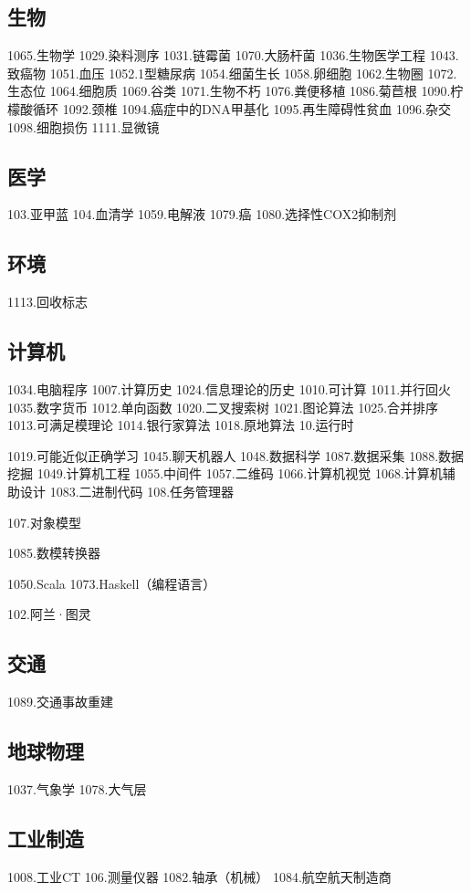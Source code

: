\subsection{生物}
1065.生物学
1029.染料测序
1031.链霉菌
1070.大肠杆菌
1036.生物医学工程
1043.致癌物
1051.血压
1052.1型糖尿病
1054.细菌生长
1058.卵细胞
1062.生物圈
1072.生态位
1064.细胞质
1069.谷类
1071.生物不朽
1076.粪便移植
1086.菊苣根
1090.柠檬酸循环
1092.颈椎
1094.癌症中的DNA甲基化
1095.再生障碍性贫血
1096.杂交
1098.细胞损伤
1111.显微镜

\subsection{医学}
103.亚甲蓝
104.血清学
1059.电解液
1079.癌
1080.选择性COX2抑制剂

\subsection{环境}
1113.回收标志

\subsection{计算机}
1034.电脑程序
1007.计算历史
1024.信息理论的历史
1010.可计算
1011.并行回火
1035.数字货币
1012.单向函数
1020.二叉搜索树
1021.图论算法
1025.合并排序
1013.可满足模理论
1014.银行家算法
1018.原地算法
10.运行时

1019.可能近似正确学习
1045.聊天机器人
1048.数据科学
1087.数据采集
1088.数据挖掘
1049.计算机工程
1055.中间件
1057.二维码
1066.计算机视觉
1068.计算机辅助设计
1083.二进制代码
108.任务管理器

107.对象模型

1085.数模转换器

1050.Scala
1073.Haskell（编程语言）

102.阿兰·图灵


\subsection{交通}
1089.交通事故重建

\subsection{地球物理}
1037.气象学
1078.大气层

\subsection{工业制造}
1008.工业CT
106.测量仪器
1082.轴承（机械）
1084.航空航天制造商
